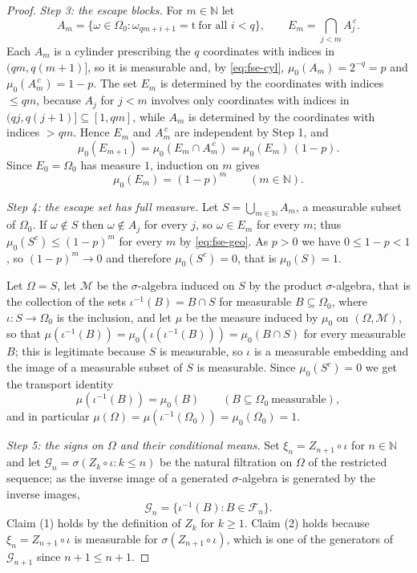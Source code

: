 \begin{proof}
\emph{Step 3: the escape blocks.}
For $m\in\mathbb N$ let
\[
  A_m=\{\omega\in\Omega_0:\omega_{qm+i+1}=\mathrm t\ \text{for all }i<q\},
  \qquad
  E_m=\bigcap_{j<m}A_j^{\,c} .
\]
Each $A_m$ is a cylinder prescribing the $q$ coordinates with indices in
$(qm,q(m+1)]$, so it is measurable and, by \eqref{eq:fse-cyl},
$\mu_0(A_m)=2^{-q}=p$ and $\mu_0(A_m^{\,c})=1-p$. The set $E_m$ is determined
by the coordinates with indices $\le qm$, because $A_j$ for $j<m$ involves only
coordinates with indices in $(qj,q(j+1)]\subseteq[1,qm]$, while $A_m$ is
determined by the coordinates with indices $>qm$. Hence $E_m$ and $A_m^{\,c}$
are independent by Step 1, and
\[
  \mu_0(E_{m+1})=\mu_0(E_m\cap A_m^{\,c})=\mu_0(E_m)\,(1-p).
\]
Since $E_0=\Omega_0$ has measure $1$, induction on $m$ gives
\begin{equation}\label{eq:fse-geo}
  \mu_0(E_m)=(1-p)^m\qquad(m\in\mathbb N).
\end{equation}

\emph{Step 4: the escape set has full measure.}
Let $S=\bigcup_{m\in\mathbb N}A_m$, a measurable subset of $\Omega_0$. If
$\omega\notin S$ then $\omega\notin A_j$ for every $j$, so $\omega\in E_m$ for
every $m$; thus $\mu_0(S^c)\le(1-p)^m$ for every $m$ by \eqref{eq:fse-geo}.
As $p>0$ we have $0\le1-p<1$, so $(1-p)^m\to0$ and therefore
$\mu_0(S^c)=0$, that is $\mu_0(S)=1$.

Let $\Omega=S$, let $\mathcal M$ be the $\sigma$-algebra induced on $S$ by the
product $\sigma$-algebra, that is the collection of the sets
$\iota^{-1}(B)=B\cap S$ for measurable $B\subseteq\Omega_0$, where
$\iota:S\to\Omega_0$ is the inclusion, and let $\mu$ be the measure induced by
$\mu_0$ on $(\Omega,\mathcal M)$, so that $\mu(\iota^{-1}(B))=\mu_0(\iota(\iota^{-1}(B)))=\mu_0(B\cap S)$
for every measurable $B$; this is legitimate because $S$ is measurable, so
$\iota$ is a measurable embedding and the image of a measurable subset of $S$
is measurable. Since $\mu_0(S^c)=0$ we get the transport identity
\begin{equation}\label{eq:fse-transport}
  \mu(\iota^{-1}(B))=\mu_0(B)\qquad(B\subseteq\Omega_0\ \text{measurable}),
\end{equation}
and in particular $\mu(\Omega)=\mu(\iota^{-1}(\Omega_0))=\mu_0(\Omega_0)=1$.

\emph{Step 5: the signs on $\Omega$ and their conditional means.}
Set $\xi_n=Z_{n+1}\circ\iota$ for $n\in\mathbb N$ and let
$\mathcal G_n=\sigma(Z_{k}\circ\iota:k\le n)$ be the natural filtration on
$\Omega$ of the restricted sequence; as the inverse image of a generated
$\sigma$-algebra is generated by the inverse images,
\begin{equation}\label{eq:fse-filt}
  \mathcal G_n=\{\iota^{-1}(B):B\in\mathcal F_n\}.
\end{equation}
Claim (1) holds by the definition of $Z_k$ for $k\ge1$. Claim (2) holds because
$\xi_n=Z_{n+1}\circ\iota$ is measurable for $\sigma(Z_{n+1}\circ\iota)$, which
is one of the generators of $\mathcal G_{n+1}$ since $n+1\le n+1$.


\end{proof}
